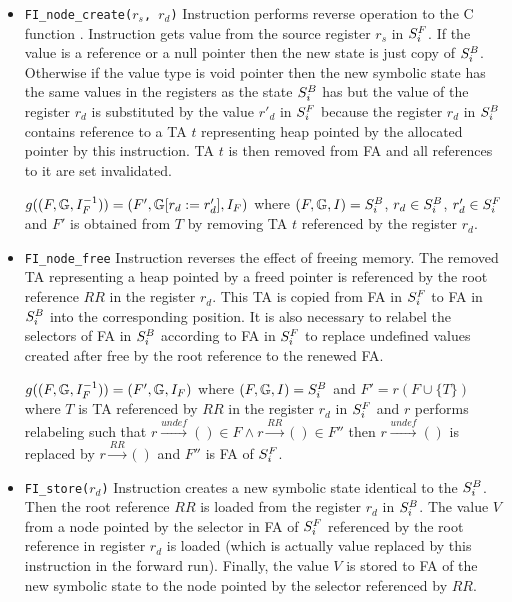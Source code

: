 \begin{itemize}
	\item {\tt FI\_node\_create($r_s$, $r_d$)}
		Instruction performs reverse operation to the C function .
		Instruction gets value from the source register $r_s$ in $S^{F}_{i}$.
		If the value is a reference or a null pointer then the new
		state is just copy of $S^{B}_{i}$.
		Otherwise if the value type is void pointer then the new symbolic
		state has the same values in the registers as the state $S^{B}_{i}$ has but
		the value of the register $r_d$ is substituted by the value $r'_{d}$ in $S^{F}_{i}$
		because the register $r_d$ in $S^{B}_{i}$ contains reference to a TA $t$
		representing heap pointed by the allocated pointer by this instruction.
		TA $t$ is then removed from FA and all references to it are set invalidated.

		$g((F, \mathbb{G}, I_{F}^{-1})) = (F', \mathbb{G} [r_{d} := r'_{d}]
			, I_{F})$
			where $(F, \mathbb{G}, I) = S^{B}_{i}$,
			$r_{d} \in S^{B}_{i}$, $r'_{d} \in S^{F}_{i}$
			and $F'$ is obtained from $T$ by removing TA $t$ referenced by the register $r_d$.

	\item {\tt FI\_node\_free}
		Instruction reverses the effect of freeing memory.
		The removed TA representing a heap pointed by a freed pointer
		is referenced by the root reference $RR$ in the register $r_d$.
		This TA is copied from FA in $S^{F}_{i}$ to FA in $S^{B}_{i}$ into the
		corresponding position.
		It is also necessary to relabel the selectors of FA in $S^{B}_{i}$
		according to FA in $S^{F}_{i}$ to replace undefined values created
		after free by the root reference to the renewed FA.

		$g((F, \mathbb{G}, I_{F}^{-1})) = (F', \mathbb{G}, I_{F})$
			where $(F, \mathbb{G}, I) = S^{B}_{i}$ and $F'= r(F \cup \{T\})$ where
			$T$ is TA referenced by $RR$ in the register $r_d$ in $S^{F}_{i}$
			and $r$ performs relabeling such that $r \xrightarrow{undef} () \in F
			\wedge r \xrightarrow{RR} () \in F''$ then $r \xrightarrow{undef} ()$ is
			replaced by $r \xrightarrow{RR} ()$ and $F''$ is FA of $S^{F}_{i}$.

	\item {\tt FI\_store($r_d$)}
		Instruction creates a new symbolic state identical to the $S^{B}_{i}$.
		Then the root reference $RR$ is loaded from the register $r_d$ in $S^{B}_{i}$.
		The value $V$ from a node pointed by the selector in FA of $S^{F}_{i}$ referenced by
		the root reference in register $r_d$ is loaded (which is actually value replaced
		by this instruction in the forward run).
		Finally, the value $V$ is stored to FA of the new symbolic state to the node
		pointed by the selector referenced by $RR$.


\end{itemize}
